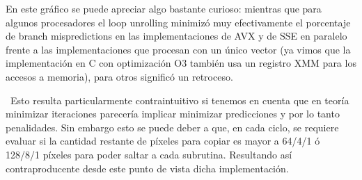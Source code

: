 En este gráfico se puede apreciar algo bastante curioso: mientras que para algunos procesadores el loop unrolling minimizó muy efectivamente el porcentaje de branch mispredictions en las implementaciones de AVX y de SSE en paralelo frente a las implementaciones que procesan con un único vector (ya vimos que la implementación en C con optimización O3 también usa un registro XMM para los accesos a memoria), para otros significó un retroceso.

\ Esto resulta particularmente contraintuitivo si tenemos en cuenta que en teoría minimizar iteraciones parecería implicar minimizar predicciones y por lo tanto penalidades. Sin embargo esto se puede deber a que, en cada ciclo, se requiere evaluar si la cantidad restante de píxeles para copiar es mayor a  64/4/1 ó 128/8/1 píxeles para poder saltar a cada subrutina. Resultando así contraproducente desde este punto de vista dicha implementación.
